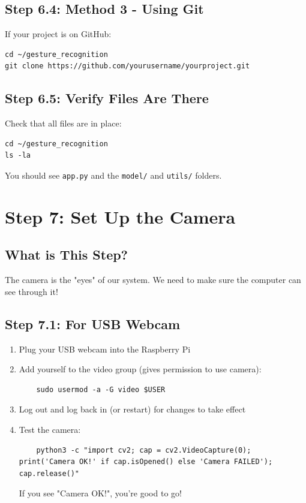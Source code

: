 \documentclass[12pt,a4paper]{article}
\begin{document}
\subsection{Step 6.4: Method 3 - Using Git}

If your project is on GitHub:

\begin{lstlisting}
cd ~/gesture_recognition
git clone https://github.com/yourusername/yourproject.git
\end{lstlisting}

\subsection{Step 6.5: Verify Files Are There}

Check that all files are in place:

\begin{lstlisting}
cd ~/gesture_recognition
ls -la
\end{lstlisting}

You should see \texttt{app.py} and the \texttt{model/} and \texttt{utils/} folders.

\section{Step 7: Set Up the Camera}

\subsection{What is This Step?}

The camera is the "eyes" of our system. We need to make sure the computer can see through it!

\subsection{Step 7.1: For USB Webcam}

\begin{enumerate}
    \item Plug your USB webcam into the Raspberry Pi
    \item Add yourself to the video group (gives permission to use camera):
    \begin{lstlisting}
    sudo usermod -a -G video $USER
    \end{lstlisting}
    
    \item Log out and log back in (or restart) for changes to take effect
    
    \item Test the camera:
    \begin{lstlisting}
    python3 -c "import cv2; cap = cv2.VideoCapture(0); print('Camera OK!' if cap.isOpened() else 'Camera FAILED'); cap.release()"
    \end{lstlisting}
    
    If you see "Camera OK!", you're good to go!
\end{enumerate}
\end{document}
